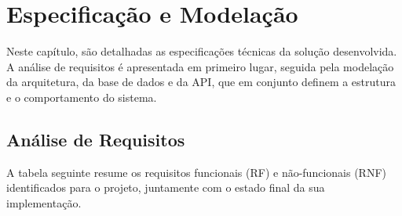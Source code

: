 \chapter{Especificação e Modelação}
\label{cha:especificacao_modelacao}

Neste capítulo, são detalhadas as especificações técnicas da solução desenvolvida. A análise de requisitos é apresentada em primeiro lugar, seguida pela modelação da arquitetura, da base de dados e da API, que em conjunto definem a estrutura e o comportamento do sistema.

\section{Análise de Requisitos}

A tabela seguinte resume os requisitos funcionais (RF) e não-funcionais (RNF) identificados para o projeto, juntamente com o estado final da sua implementação.


